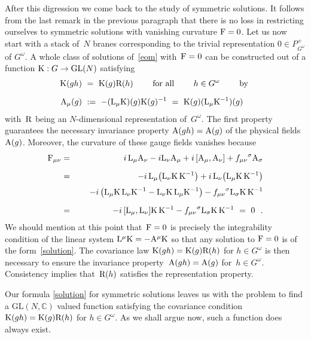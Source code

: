 \documentclass[12pt,a4paper]{article}
\newcommand{\GL}{{\text{GL}}}
\def\iG{G^\omega} %
\def\tR{{\rm R}} %
\def\tK{{\rm K}} %
\def\tF{{\rm F}}
\def\tA{{\rm A}}
\def\tL{{\rm L}}
\begin{document}
After this digression we come back to the study of symmetric solutions. 
It follows from the last remark in the previous paragraph that there is
no loss in restricting ourselves to symmetric solutions with vanishing 
curvature $\tF=0$. Let us now start with a stack of~$N$ branes 
corresponding to the trivial representation $0\in P_{\iG}^+$
of $\iG$. A whole class of solutions of~\eqref{eom} with~$\tF=0$ can 
be constructed out of a function $\tK:G\to\GL(N)$ satisfying
\begin{equation}
  \label{solution}
  \begin{split}
  \tK(gh)&\ =\ \tK(g)\tR(h)\qquad\text{ for all }\qquad 
   h\in\iG\qquad\text{ by }\\[2mm] 
  \tA_{\mu}(g)&\ :=\ -(\tL_{\mu}\tK)(g)\tK(g)^{-1}
  \ =\ \tK(g)(\tL_{\mu}\tK^{-1}) (g)
  \end{split}
\end{equation}
with~$\tR$ being an $N$-dimensional representation of~$\iG$.
The first property guarantees the necessary invariance property
$\tA(gh)=\tA(g)$ of the physical fields~$\tA(g)$. Moreover, the 
curvature of these gauge fields vanishes because 
\begin{eqnarray*}
  \tF_{\mu\nu}
  &=& \, i\,\tL_{\mu}\tA_{\nu}-i\tL_{\nu}\tA_{\mu} + i\,[\tA_{\mu},\tA_{\nu}]
     + {f_{\mu\nu}}^{\sigma}\tA_{\sigma}\\[2mm]
  &=& -i\,\tL_{\mu}\bigl(\tL_{\nu}\tK \, \tK^{-1}\bigr)
      +i\,\tL_{\nu} \bigl(\tL_{\mu}\tK\,\tK^{-1}\bigr)\\[1mm]
   && \ \ \ \ -i\,\bigl(\tL_\mu\tK\,\tL_\nu\tK^{-1}-\tL_\nu\tK\,\tL_\mu\tK^{-1}\bigr)
     - {f_{\mu\nu}}^{\sigma}\tL_{\sigma}\tK\,\tK^{-1}\\[2mm] 
  &=& -i\,[\tL_{\mu},\tL_{\nu}]\tK\,\tK^{-1}-{f_{\mu\nu}}^{\sigma}
  \tL_{\sigma}\tK\,\tK^{-1}\ = \ 0  \ \ .
\end{eqnarray*}
We should mention at this point that~$\tF=0$ is precisely the 
integrability condition of the linear system $\tL^{\mu}\tK=-\tA^{\mu}
\tK$ so that any solution to $\tF = 0$ is of the form~\eqref{solution}.
The covariance law $\tK(gh)=\tK(g)\tR(h)$ for $h\in\iG$ is then
necessary to ensure the invariance property~$\tA(gh)=\tA(g)$
for~$h\in\iG$. Consistency implies that~$\tR(h)$ satisfies the 
representation property. 
\smallskip 

Our formula \eqref{solution} for symmetric solutions leaves us 
with the problem to find a $\GL(N,\mathbb{C})$ valued function 
satisfying the covariance condition $\tK (gh)=\tK(g)\tR(h)$ 
for $h \in \iG$. As we shall argue now, such a function does 
always exist. 
\smallskip
\end{document}
